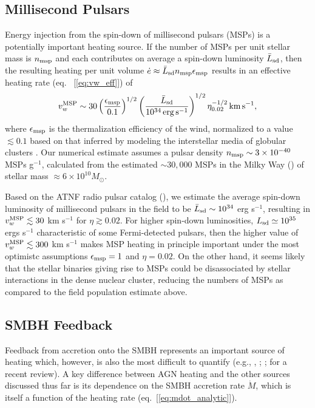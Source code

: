 \documentclass[usenatbib,fleqn]{mn2e}
\begin{document}
\subsection{Millisecond Pulsars}
 Energy injection from the spin-down of millisecond pulsars (MSPs) is a potentially
important heating source.  If the number of MSPs per unit stellar mass
is $n_{\rm msp}$ and each contributes on average a spin-down
luminosity $\bar{L}_{\rm sd}$, then the resulting heating per unit
volume $\dot{e} \approx \bar{L}_{\rm sd}n_{\rm msp}\epsilon_{\rm msp}$ results in an
effective heating rate (eq.~ [\ref{eq:vw_eff}]) of 
\begin{eqnarray} v_{w}^{\rm MSP} \sim
30\left(\frac{\epsilon_{\rm msp}}{0.1}\right)^{1/2}\left(\frac{\bar{L}_{\rm
sd}}{10^{34}\,{\rm erg\,s^{-1}}}\right)^{1/2} \eta_{0.02}^{-1/2}\,{\rm
km\,s^{-1}},
 \label{eq:vmsp}
  \end{eqnarray} 
where $\epsilon_{\rm msp}$ is the thermalization efficiency of
the wind, normalized to a value $\lesssim 0.1$ based on that inferred by modeling the interstellar media of globular clusters
\citep{NaimanSoares-Furtado+:2013a}.  Our numerical estimate assumes a
pulsar density $n_{\rm msp} \sim 3 \times 10^{-40} $ MSPs g$^{-1}$, calculated from the estimated $\sim 30,000$ MSPs in the Milky Way (\citealt{Lorimer13}) of stellar mass $\approx 6\times 10^{10}M_{\odot}$.

Based on the ATNF radio pulsar catalog (\citealt{Manchester+05}), we estimate the average spin-down luminosity of millisecond pulsars in the field to be $\bar{L}_{\rm sd} \sim 10^{34}$ erg s$^{-1}$, resulting in $v_{w}^{\rm MSP} \lesssim 30$ km s$^{-1}$ for $\eta \gtrsim 0.02$.  For higher spin-down
luminosities, $L_{\rm sd}\simeq 10^{35}$ ergs s$^{-1}$ characteristic
of some Fermi-detected pulsars, then the higher value of $v_{w}^{\rm MSP}
\lesssim 300$ km s$^{-1}$ makes MSP heating in principle important
under the most optimistc assumptions $\epsilon_{\rm msp} = 1$ and $\eta = 0.02$.  On the other hand, it seems likely that the stellar binaries giving rise to MSPs could be disassociated by stellar interactions in the dense nuclear cluster, reducing the numbers of MSPs as compared to the field population estimate above.  


\subsection{SMBH Feedback}

Feedback from accretion onto the SMBH represents an important source of heating which, however, is also the most difficult to quantify (e.g., \citealt{Brighenti&Mathews03}, \citealt{DiMatteo+05}; \citealt{Kurosawa&Proga09}; \citealt{Fabian12} for a recent review).  A key difference between AGN heating and the other sources discussed thus far is its dependence on the SMBH accretion rate $\dot{M}$, which is itself a function of the heating rate (eq.~[\ref{eq:mdot_analytic}]).  
\end{document}
